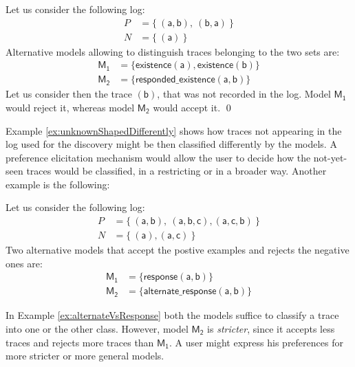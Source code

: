\begin{example}
\label{ex:unknownShapedDifferently}
Let us consider the following log:
\begin{align*}
P & = \{\ (\mathsf{a}, \mathsf{b}),\ (\mathsf{b}, \mathsf{a})\ \} \\
N & = \{\ (\mathsf{a})\ \}
\end{align*}
%
Alternative models allowing to distinguish traces belonging to the two sets are:
\begin{align*}
\mathsf{M_1} & = \{ \mathsf{existence(a),existence(b)}\} \\
\mathsf{M_2} & = \{ \mathsf{responded\_existence(a, b)}\}
\end{align*}
%
Let us consider then the trace $\mathsf{(b)}$, that was not recorded in the log. Model $\mathsf{M_1}$ would reject it, whereas model $\mathsf{M_2}$ would accept it.
\qed
\end{example}

Example \ref{ex:unknownShapedDifferently} shows how traces not appearing in the log used for the discovery might be then classified differently by the models. A preference elicitation mechanism would allow the user to decide how the not-yet-seen traces would be classified, in a restricting or in a broader way. Another example is the following:

\begin{example}
\label{ex:alternateVsResponse}
Let us consider the following log:
\begin{align*}
P & = \{\ (\mathsf{a}, \mathsf{b}),\ (\mathsf{a}, \mathsf{b}, \mathsf{c}),(\mathsf{a}, \mathsf{c}, \mathsf{b})\ \} \\
N & = \{\ (\mathsf{a}), (\mathsf{a}, \mathsf{c})\ \}
\end{align*}
%
Two alternative models that accept the postive examples and rejects the negative ones are:
\begin{align*}
\mathsf{M_1} & = \{ \mathsf{response(a,b)}\} \\
\mathsf{M_2} & = \{ \mathsf{alternate\_response(a, b)}\} \tag*{$\square$}
\end{align*}
\end{example}

In Example \ref{ex:alternateVsResponse} both the models suffice to classify a trace into one or the other class. However, model $\mathsf{M_2}$ is \emph{stricter}, since it accepts less traces and rejects more traces than $\mathsf{M_1}$. A user might express his preferences for more stricter or more general models.


